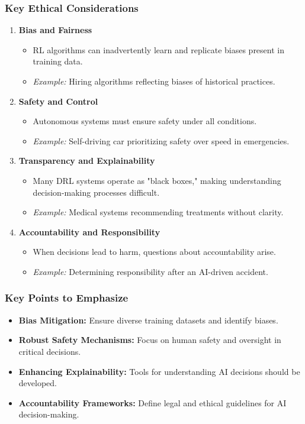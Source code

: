 \documentclass[aspectratio=169]{beamer}
\begin{document}
\begin{frame}[fragile]
    \frametitle{Key Ethical Considerations}
    \begin{enumerate}
        \item \textbf{Bias and Fairness}
        \begin{itemize}
            \item RL algorithms can inadvertently learn and replicate biases present in training data.
            \item \textit{Example:} Hiring algorithms reflecting biases of historical practices.
        \end{itemize}

        \item \textbf{Safety and Control}
        \begin{itemize}
            \item Autonomous systems must ensure safety under all conditions.
            \item \textit{Example:} Self-driving car prioritizing safety over speed in emergencies.
        \end{itemize}

        \item \textbf{Transparency and Explainability}
        \begin{itemize}
            \item Many DRL systems operate as "black boxes," making understanding decision-making processes difficult.
            \item \textit{Example:} Medical systems recommending treatments without clarity.
        \end{itemize}

        \item \textbf{Accountability and Responsibility}
        \begin{itemize}
            \item When decisions lead to harm, questions about accountability arise.
            \item \textit{Example:} Determining responsibility after an AI-driven accident.
        \end{itemize}
    \end{enumerate}
\end{frame}

\begin{frame}[fragile]
    \frametitle{Key Points to Emphasize}
    \begin{itemize}
        \item \textbf{Bias Mitigation:} Ensure diverse training datasets and identify biases.
        \item \textbf{Robust Safety Mechanisms:} Focus on human safety and oversight in critical decisions.
        \item \textbf{Enhancing Explainability:} Tools for understanding AI decisions should be developed.
        \item \textbf{Accountability Frameworks:} Define legal and ethical guidelines for AI decision-making.
    \end{itemize}
\end{frame}
\end{document}
